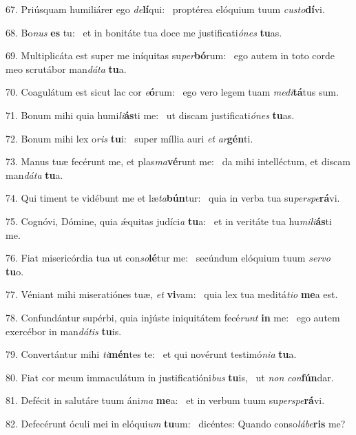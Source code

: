 67. Priúsquam humiliárer ego \textit{de}\textbf{lí}qui: \ast\  proptérea elóquium tuum \textit{cus}\textit{to}\textbf{dí}vi.\

68. Bo\textit{nus} \textbf{es} tu: \ast\  et in bonitáte tua doce me justificati\textit{ó}\textit{nes} \textbf{tu}as.\

69. Multiplicáta est super me iníquitas su\textit{per}\textbf{bó}rum: \ast\  ego autem in toto corde meo scrutábor man\textit{dá}\textit{ta} \textbf{tu}a.\

70. Coagulátum est sicut lac cor \textit{e}\textbf{ó}rum: \ast\  ego vero legem tuam \textit{me}\textit{di}\textbf{tá}tus sum.\

71. Bonum mihi quia humi\textit{li}\textbf{ás}ti me: \ast\  ut discam justificati\textit{ó}\textit{nes} \textbf{tu}as.\

72. Bonum mihi lex o\textit{ris} \textbf{tu}i: \ast\  super míllia auri \textit{et} \textit{ar}\textbf{gén}ti.\

73. Manus tuæ fecérunt me, et plas\textit{ma}\textbf{vé}runt me: \ast\  da mihi intelléctum, et discam man\textit{dá}\textit{ta} \textbf{tu}a.\

74. Qui timent te vidébunt me et læ\textit{ta}\textbf{bún}tur: \ast\  quia in verba tua su\textit{per}\textit{spe}\textbf{rá}vi.\

75. Cognóvi, Dómine, quia ǽquitas judíci\textit{a} \textbf{tu}a: \ast\  et in veritáte tua hu\textit{mi}\textit{li}\textbf{ás}ti me.\

76. Fiat misericórdia tua ut con\textit{so}\textbf{lé}tur me: \ast\  secúndum elóquium tuum \textit{ser}\textit{vo} \textbf{tu}o.\

77. Véniant mihi miseratiónes tuæ, \textit{et} \textbf{vi}vam: \ast\  quia lex tua meditá\textit{ti}\textit{o} \textbf{me}a est.\

78. Confundántur supérbi, quia injúste iniquitátem fecé\textit{runt} \textbf{in} me: \ast\  ego autem exercébor in man\textit{dá}\textit{tis} \textbf{tu}is.\

79. Convertántur mihi \textit{ti}\textbf{mén}tes te: \ast\  et qui novérunt testimó\textit{ni}\textit{a} \textbf{tu}a.\

80. Fiat cor meum immaculátum in justificatióni\textit{bus} \textbf{tu}is, \ast\  ut \textit{non} \textit{con}\textbf{fún}dar.\

81. Defécit in salutáre tuum áni\textit{ma} \textbf{me}a: \ast\  et in verbum tuum su\textit{per}\textit{spe}\textbf{rá}vi.\

82. Defecérunt óculi mei in elóqui\textit{um} \textbf{tu}um: \ast\  dicéntes: Quando conso\textit{lá}\textit{be}\textbf{ris} me?\

